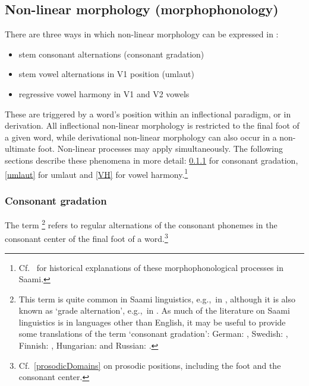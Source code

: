 \subsection{Non-linear morphology (morphophonology)}\label{morphophonology}
There are three ways %
in which non-linear morphology can be expressed in \PS:
\begin{itemize}
\item{stem consonant alternations (consonant gradation)}
\item{stem vowel alternations in V1 position (umlaut)}
\item{regressive vowel harmony in V1 and V2 vowels}
\end{itemize}
These are triggered by a word’s position %
within an inflectional paradigm, or in derivation. All inflectional non-linear morphology is restricted to the final foot of a given word, while derivational non-linear morphology can also occur in a non-ultimate foot. Non-linear processes may apply simultaneously. The following sections describe these phenomena in more detail: \SEC\ref{Cgrad} for consonant gradation, \SEC\ref{umlaut} for umlaut and \SEC\ref{VH} for vowel harmony.\footnote{Cf.~\citet{KorhonenM1969} for historical explanations of these morphophonological processes in Saami.} 


\subsubsection{Consonant gradation}\label{Cgrad}
The term \footnote{This term is quite common in Saami linguistics, e.g.,~in \citet{Feist2010}, although it is also known as ‘grade alternation’, e.g.,~in \citet{Sammallahti1998}. As much of the literature on Saami linguistics is in languages other than English, it may be useful to provide some translations of the term ‘consonant gradation’: German: , Swedish: , Finnish: , Hungarian:  and Russian: .} 
refers to regular alternations of the consonant phonemes in the consonant center of the final foot of a word.\footnote{Cf.~\SEC\ref{prosodicDomains} on prosodic positions, including the foot and the consonant center.} 

